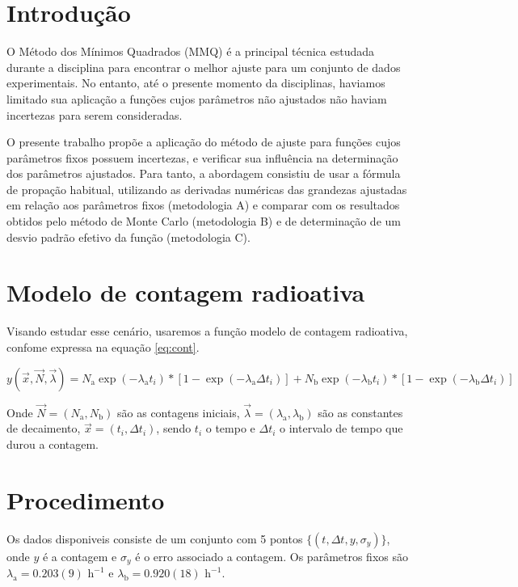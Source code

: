 \section{Introdução}

O Método dos Mínimos Quadrados (MMQ) é a principal técnica estudada durante a disciplina para encontrar o melhor ajuste para um conjunto de dados experimentais. No entanto, até o presente momento da disciplinas, haviamos limitado sua aplicação a funções cujos parâmetros não ajustados não haviam incertezas para serem consideradas. 

O presente trabalho propõe a aplicação do método de ajuste para funções cujos parâmetros fixos possuem incertezas, e verificar sua influência na determinação dos parâmetros ajustados. Para tanto, a abordagem consistiu de usar a fórmula de propação habitual, utilizando as derivadas numéricas das grandezas ajustadas em relação aos parâmetros fixos (metodologia A) e comparar com os resultados obtidos pelo método de Monte Carlo (metodologia B) e de determinação de um desvio padrão efetivo da função (metodologia C).

\section{Modelo de contagem radioativa}

Visando estudar esse cenário, usaremos a função modelo de contagem radioativa, confome expressa na equação \eqref{eq:cont}. 

\begin{equation}
    y(\vec{x}, \vec{N}, \vec{\lambda}) = N_{\text{a}} \exp(-\lambda_{\text{a}} t_i)*\left[ 1 - \exp(-\lambda_{\text{a}}\Delta t_i) \right] + N_{\text{b}} \exp(-\lambda_{\text{b}} t_i)*\left[ 1 - \exp(-\lambda_{\text{b}}\Delta t_i) \right]
    \label{eq:cont}
\end{equation}

Onde $\vec{N} = (N_{\text{a}},N_{\text{b}})$ são as contagens iniciais, $\vec{\lambda} = (\lambda_{\text{a}}, \lambda_{\text{b}})$ são as constantes de decaimento, $\vec{x} = (t_i, \Delta t_i)$, sendo $t_i$ o tempo e $\Delta t_i$ o intervalo de tempo que durou a contagem.

\section{Procedimento}

Os dados disponiveis consiste de um conjunto com 5 pontos $\{ (t, \Delta t, y, \sigma_y) \}$, onde $y$ é a contagem e $\sigma_y$ é o erro associado a contagem. Os parâmetros fixos são $\lambda_{\text{a}} = 0.203(9)\text{ h}^{-1}$ e $\lambda_{\text{b}} = 0.920(18)\text{ h}^{-1}$.

